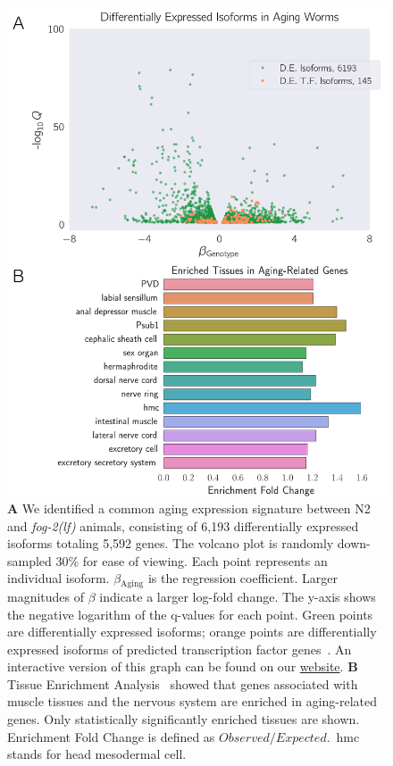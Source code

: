 \documentclass[9pt,twocolumn,twoside]{gsag3jnl}
\newcommand{\fog}{\emph{\mbox{fog-2(lf)}}}
\newcommand{\agen}{5,592}
\newcommand{\webref}{
\href{https://wormlabcaltech.github.io/Angeles_Leighton_2016}{website}}
\begin{document}
\begin{figure}[htbp]
  \renewcommand{\familydefault}{\sfdefault}\normalfont{}
  \centering
  \includegraphics[width=\linewidth]{../../output/figs/final_figs/aging_transcriptomics.pdf}
  \caption{
    \textbf{A} We identified a common aging expression signature between N2 and
    \fog{} animals, consisting of 6,193 differentially expressed isoforms
    totaling \agen{} genes. The volcano plot is randomly down-sampled 30\% for
    ease of viewing. Each point represents an individual isoform.
    $\beta{}_\mathrm{Aging}$ is the regression coefficient. Larger magnitudes of
    $\beta$ indicate a larger log-fold change. The y-axis shows the negative
    logarithm of the q-values for each point. Green points are differentially
    expressed isoforms; orange points are differentially expressed isoforms of
    predicted transcription factor genes~\citep{Reece-Hoyes2005}. An interactive
    version of this graph can be found on our \webref{}. \textbf{B} Tissue
    Enrichment Analysis~\citep{Angeles-Albores2016} showed that genes associated
    with muscle tissues and the nervous system are enriched in aging-related
    genes. Only statistically significantly enriched tissues are shown.
    Enrichment Fold Change is defined as $Observed/Expected$.\ hmc stands for
    head mesodermal cell.
  }
\label{fig:agingtranscriptome}
\end{figure}
\end{document}
